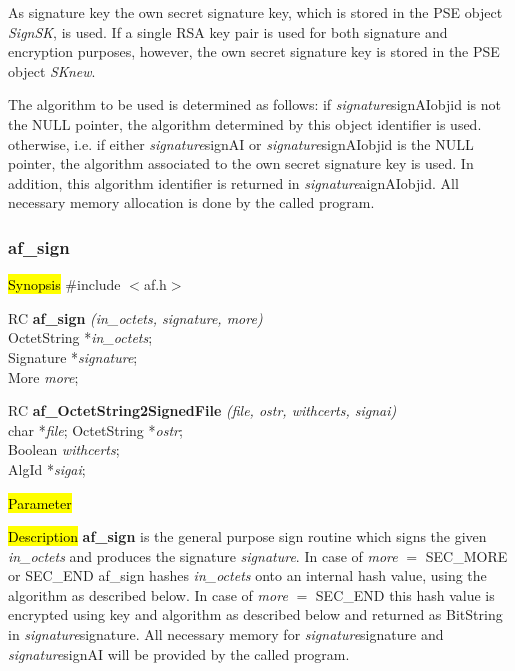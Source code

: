 As signature key the own secret signature key, which is stored in the PSE
object {\em SignSK}, is used. If a single RSA key pair is used for both signature and encryption purposes, however,
the own secret signature key is stored in the PSE object {\em SKnew}. 

The algorithm to be used is determined as follows:
\be
\m if {\em signature}\pf signAI\pf objid is not the NULL pointer, the algorithm
   determined by this object identifier is used.
\m otherwise, i.e. if either {\em signature}\pf signAI or {\em signature}\pf signAI\pf objid 
   is the NULL pointer, the algorithm
   associated to the own secret signature key is used.
   In addition, this algorithm identifier is returned in {\em signature}\pf aignAI\pf objid.
   All necessary memory allocation is done by the called program.
\ee

\subsubsection{af\_sign}
\label{af_sign}
\hl{Synopsis}
\#include $<$af.h$>$

RC {\bf af\_sign} {\em (in\_octets, signature, more)} \\
OctetString *{\em in\_octets}; \\
Signature *{\em signature}; \\
More {\em more};

RC {\bf af\_OctetString2SignedFile} {\em (file, ostr, withcerts, signai)} \\
char *{\em file};
OctetString *{\em ostr}; \\
Boolean {\em withcerts}; \\
AlgId *{\em sigai};

\hl{Parameter}



\hl{Description}
{\bf af\_sign} is the general purpose sign routine which signs the given
{\em in\_octets} and produces the signature {\em signature}.
In case of {\em more} $=$ SEC\_MORE or SEC\_END af\_sign hashes {\em in\_octets} onto
an internal hash value, using the algorithm as described below.
In case of {\em more} $=$ SEC\_END this hash value is encrypted using key and
algorithm as described below and returned as BitString in {\em signature}\pf signature.
All necessary memory for {\em signature}\pf signature and {\em signature}\pf signAI
will be provided by the called program.

